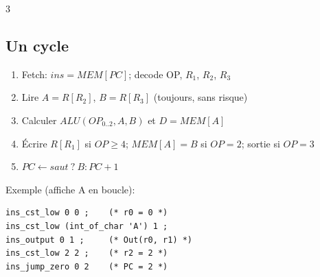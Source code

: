 \documentclass[12pt, a4paper]{article}
\begin{document}
\begin{multicols*}{3}
	\subsection{Un cycle}
	\begin{enumerate}[\roman*.]
		\item Fetch: $ins=MEM[PC]$; decode OP, $R_1$, $R_2$, $R_3$
		\item Lire $A=R[R_2]$, $B=R[R_3]$ (toujours, sans risque)
		\item Calculer $ALU(OP_{0..2},A,B)$ et $D=MEM[A]$
		\item Écrire $R[R_1]$ si $OP\geq4$; $MEM[A]=B$ si $OP=2$; sortie si $OP=3$
		\item $PC\leftarrow saut\ ?\ B:PC+1$
	\end{enumerate}
 
	Exemple (affiche A en boucle):\\
	\noindent\begin{minipage}{\linewidth}
		\begin{lstlisting}[style=ocaml]
ins_cst_low 0 0 ;    (* r0 = 0 *)
ins_cst_low (int_of_char 'A') 1 ;
ins_output 0 1 ;     (* Out(r0, r1) *)
ins_cst_low 2 2 ;    (* r2 = 2 *)
ins_jump_zero 0 2    (* PC = 2 *)
\end{lstlisting}
	\end{minipage}
 
\end{multicols*}
\end{document}
